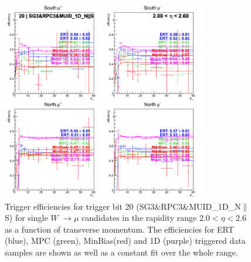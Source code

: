 \begin{figure}[h!]

  \centering

  \includegraphics[width=0.8\textwidth]{./figures/run13_trigeffipt_eta2_trig20_lin.png}
  \caption{\label{fig:run13_trigeffipt_eta2_nper0_trig20_lin} Trigger efficiencies for trigger bit 20 (SG3\&RPC3\&MUID\_1D\_N$\|$S) for single $W$ $\rightarrow \mu$ candidates in the rapidity range $ 2.0 < \eta < 2.6$ as a function of transverse momentum. The efficiencies for ERT (blue), MPC (green), MinBias(red) and 1D (purple) triggered data samples are shown as well as a constant fit over the whole range.}

\end{figure}
\clearpage
